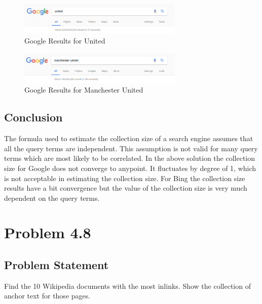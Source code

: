 \documentclass[12pt]{report}
\begin{document}
\begin{figure}[ht] 
  \centering
  \includegraphics[width=0.7\textwidth]{Google_united.png}
  \caption{Google Results for United}
  \label{fig:23}
\end{figure}

\begin{figure}[ht] 
  \centering
  \includegraphics[width=0.7\textwidth]{Google_manchesterunited.png}
  \caption{Google Results for Manchester United}
  \label{fig:24}
\end{figure}

\section{Conclusion}
The formula used to estimate the collection size of a search engine assumes that all the query terms are independent. This assumption is not valid for many query terms which are most likely to be correlated. In the above solution the collection size for Google does not converge to anypoint. It fluctuates by degree of 1, which is not acceptable in estimating the collection size. For Bing the collection size results have a bit convergence but the value of the collection size is very much dependent on the query terms. 

\chapter{Problem 4.8}
\section{Problem Statement}
Find the 10 Wikipedia documents with the most inlinks. Show the collection of anchor text for those pages.
\end{document}
